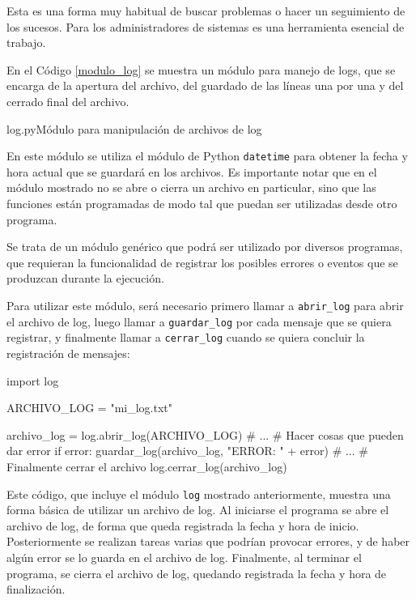 Esta es una forma muy habitual de buscar problemas o hacer un seguimiento
de los sucesos. Para los administradores de sistemas es una herramienta
esencial de trabajo.

En el Código \ref{modulo_log} se muestra un módulo para manejo de logs, que
se encarga de la apertura del archivo, del guardado de las líneas una por
una y del cerrado final del archivo.

\begin{codigo}{log.py}{Módulo para manipulación de archivos de log}
\label{modulo_log}

\end{codigo}

En este módulo se utiliza el módulo de Python \lstinline!datetime! para
obtener la fecha y hora actual que se guardará en los archivos.  Es
importante notar que en el módulo mostrado no se abre o cierra un archivo
en particular, sino que las funciones están programadas de modo tal que
puedan ser utilizadas desde otro programa.

Se trata de un módulo genérico que podrá ser utilizado por diversos programas,
que requieran la funcionalidad de registrar los posibles errores o eventos que
se produzcan durante la ejecución.

Para utilizar este módulo, será necesario primero llamar a
\lstinline!abrir_log! para abrir el archivo de log, luego llamar a
\lstinline!guardar_log! por cada mensaje que se quiera registrar, y
finalmente llamar a \lstinline!cerrar_log! cuando se quiera concluir la
registración de mensajes:

\begin{codigo-python-sn}
import log

ARCHIVO_LOG = "mi_log.txt"

archivo_log = log.abrir_log(ARCHIVO_LOG)
# ...
# Hacer cosas que pueden dar error
if error:
    guardar_log(archivo_log, "ERROR: " + error)
# ...
# Finalmente cerrar el archivo
log.cerrar_log(archivo_log)
\end{codigo-python-sn}

Este código, que incluye el módulo \lstinline!log! mostrado anteriormente,
muestra una forma básica de utilizar un archivo de log.  Al iniciarse el
programa se abre el archivo de log, de forma que queda registrada la fecha
y hora de inicio.  Posteriormente se realizan tareas varias que podrían
provocar errores, y de haber algún error se lo guarda en el archivo de log.
Finalmente, al terminar el programa, se cierra el archivo de log, quedando
registrada la fecha y hora de finalización.

